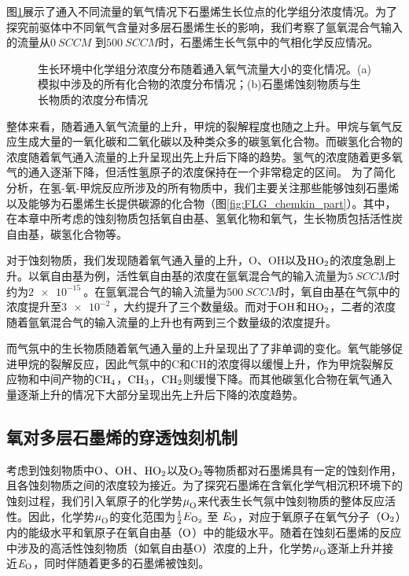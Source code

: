图\ref{fig:FLG_chemkin}展示了通入不同流量的氧气情况下石墨烯生长位点的化学组分浓度情况。为了探究前驱体中不同氧气含量对多层石墨烯生长的影响，我们考察了氩氧混合气输入的流量从$\SI{0}{SCCM}$ 到$\SI{500}{SCCM}$时，石墨烯生长气氛中的气相化学反应情况。

\begin{figure}[htb]
    \caption{生长环境中化学组分浓度分布随着通入氧气流量大小的变化情况。(a)模拟中涉及的所有化合物的浓度分布情况；(b)石墨烯蚀刻物质与生长物质的浓度分布情况}
    \label{fig:FLG_chemkin}
\end{figure}

整体来看，随着通入氧气流量的上升，甲烷的裂解程度也随之上升。甲烷与氧气反应生成大量的一氧化碳和二氧化碳以及种类众多的碳氢氧化合物。而碳氢化合物的浓度随着氧气通入流量的上升呈现出先上升后下降的趋势。氢气的浓度随着更多氧气的通入逐渐下降，但活性氢原子的浓度保持在一个非常稳定的区间。
为了简化分析，在氢-氧-甲烷反应所涉及的所有物质中，我们主要关注那些能够蚀刻石墨烯以及能够为石墨烯生长提供碳源的化合物（图\ref{fig:FLG_chemkin_part}）。其中，在本章中所考虑的蚀刻物质包括氧自由基、氢氧化物和氧气，生长物质包括活性炭自由基，碳氢化合物等。

对于蚀刻物质，我们发现随着氧气通入量的上升，O、OH以及$\cemb{HO2}$的浓度急剧上升。以氧自由基为例，活性氧自由基的浓度在氩氧混合气的输入流量为$\SI{5}{SCCM}$时约为$\SI{2e-15}{}$。在氩氧混合气的输入流量为$\SI{500}{SCCM}$时，氧自由基在气氛中的浓度提升至$\SI{3e-2}{}$，大约提升了三个数量级。而对于$\cemb{OH}$和$\cemb{HO2}$，二者的浓度随着氩氧混合气的输入流量的上升也有两到三个数量级的浓度提升。

而气氛中的生长物质随着氧气通入量的上升呈现出了了非单调的变化。氧气能够促进甲烷的裂解反应，因此气氛中的C和CH的浓度得以缓慢上升，作为甲烷裂解反应物和中间产物的$\cemb{CH4}$，$\cemb{CH3}$，$\cemb{CH2}$则缓慢下降。而其他碳氢化合物在氧气通入量逐渐上升的情况下大部分呈现出先上升后下降的浓度趋势。
\subsection{氧对多层石墨烯的穿透蚀刻机制}
\label{subsec:FLG_Oetch}

考虑到蚀刻物质中$\cemb{O}$、$\cemb{OH}$、$\cemb{HO2}$以及$\cemb{O2}$等物质都对石墨烯具有一定的蚀刻作用，且各蚀刻物质之间的浓度较为接近。为了探究石墨烯在含氧化学气相沉积环境下的蚀刻过程，我们引入氧原子的化学势$\mu_{\rm O}^{\rm } \it$来代表生长气氛中蚀刻物质的整体反应活性。因此，化学势$\mu_{\rm O}^{\rm } \it$的变化范围为$\halfEOm$ 至 $\it E_{\rm O} \it$，对应于氧原子在氧气分子（$\cemb{O2}$）内的能级水平和氧原子在氧自由基（$\cemb{O}$）中的能级水平。随着在蚀刻石墨烯的反应中涉及的高活性蚀刻物质（如氧自由基O）浓度的上升，化学势$\mu_{\rm O}^{\rm } \it$逐渐上升并接近$\it E_{\rm O} \it$，同时伴随着更多的石墨烯被蚀刻。

